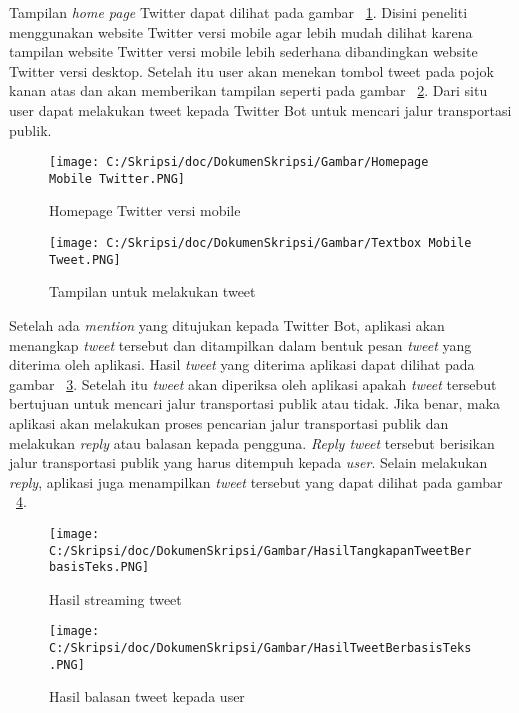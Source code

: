 Tampilan \textit{home page} Twitter dapat dilihat pada gambar ~\ref{fig:Homepage Mobile Twitter}. Disini peneliti menggunakan website Twitter versi mobile agar lebih mudah dilihat karena tampilan website Twitter versi mobile lebih sederhana dibandingkan website Twitter versi desktop. Setelah itu user akan menekan tombol tweet pada pojok kanan atas dan akan memberikan tampilan seperti pada gambar ~\ref{fig:Textbox Mobile Tweet}. Dari situ user dapat melakukan tweet kepada Twitter Bot untuk mencari jalur transportasi publik.

\begin{figure}[htbp]
	\centering
		\texttt{[image: C:/Skripsi/doc/DokumenSkripsi/Gambar/Homepage Mobile Twitter.PNG]}
	\caption{Homepage Twitter versi mobile}
	\label{fig:Homepage Mobile Twitter}
\end{figure}


\begin{figure}[htbp]
	\centering
		\texttt{[image: C:/Skripsi/doc/DokumenSkripsi/Gambar/Textbox Mobile Tweet.PNG]}
	\caption{Tampilan untuk melakukan tweet}
	\label{fig:Textbox Mobile Tweet}
\end{figure}

Setelah ada \textit{mention} yang ditujukan kepada Twitter Bot, aplikasi akan menangkap \textit{tweet} tersebut dan ditampilkan dalam bentuk pesan \textit{tweet} yang diterima oleh aplikasi. Hasil \textit{tweet} yang diterima aplikasi dapat dilihat pada gambar ~\ref{fig:HasilTangkapanTweetBerbasisTeks}. Setelah itu \textit{tweet} akan diperiksa oleh aplikasi apakah \textit{tweet} tersebut bertujuan untuk mencari jalur transportasi publik atau tidak. Jika benar, maka aplikasi akan melakukan proses pencarian jalur transportasi publik dan melakukan \textit{reply} atau balasan kepada pengguna. \textit{Reply tweet} tersebut berisikan jalur transportasi publik yang harus ditempuh kepada \textit{user}. Selain melakukan \textit{reply}, aplikasi juga menampilkan \textit{tweet} tersebut yang dapat dilihat pada gambar ~\ref{fig:HasilTweetBerbasisTeks}.

\begin{figure}
	\centering
		\texttt{[image: C:/Skripsi/doc/DokumenSkripsi/Gambar/HasilTangkapanTweetBerbasisTeks.PNG]}
	\caption{Hasil streaming tweet}
	\label{fig:HasilTangkapanTweetBerbasisTeks}
\end{figure}

\begin{figure}
	\centering
		\texttt{[image: C:/Skripsi/doc/DokumenSkripsi/Gambar/HasilTweetBerbasisTeks.PNG]}
	\caption{Hasil balasan tweet kepada user}
	\label{fig:HasilTweetBerbasisTeks}
\end{figure}
\fi

